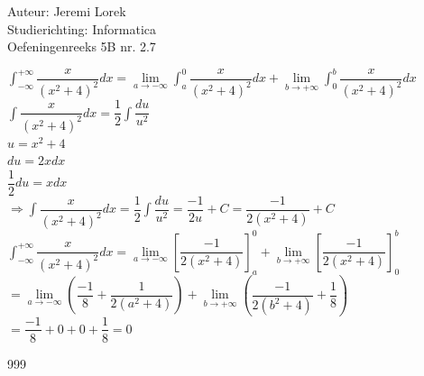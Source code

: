 \documentclass[a4paper]{article}
\begin{document}
\noindent \large Auteur: Jeremi Lorek\\
\noindent \large Studierichting: Informatica\\
\noindent \large Oefeningenreeks 5B nr. 2.7\\

\medskip
\normalsize

$\displaystyle \int_{-\infty}^{+\infty} \dfrac{x}{(x^2 + 4)^2} dx = \lim\limits_{a \to -\infty} \int_a^0 \dfrac{x}{(x^2 + 4)^2} dx + \lim\limits_{b \to +\infty} \int_0^b \dfrac{x}{(x^2 + 4)^2} dx$ \\

$\displaystyle \int \dfrac{x}{(x^2 + 4)^2} dx = \dfrac{1}{2} \int \dfrac{du}{u^2}$ \\

$u = x^2 + 4$ \\

$du = 2x dx$ \\

$\dfrac{1}{2} du = x dx$ \\

$\Rightarrow \displaystyle \int \dfrac{x}{(x^2 + 4)^2} dx = \dfrac{1}{2} \int \dfrac{du}{u^2} = \dfrac{-1}{2u} + C = \dfrac{-1}{2(x^2 + 4)} + C$ \\

$\displaystyle \int_{-\infty}^{+\infty} \dfrac{x}{(x^2 + 4)^2} dx = \lim\limits_{a \to -\infty} \left[ \dfrac{-1}{2(x^2 + 4)} \right]_a^0 + \lim\limits_{b \to +\infty} \left[ \dfrac{-1}{2(x^2 + 4)} \right]_0^b$ \\

$= \lim\limits_{a \to -\infty} \left( \dfrac{-1}{8} + \dfrac{1}{2(a^2 + 4)} \right) + \lim\limits_{b \to +\infty} \left( \dfrac{-1}{2(b^2 + 4)} + \dfrac{1}{8} \right)$ \\

$= \dfrac{-1}{8} + 0 + 0 + \dfrac{1}{8} = 0$ \\

\begin{thebibliography}{999}
\end{thebibliography}
\end{document}
